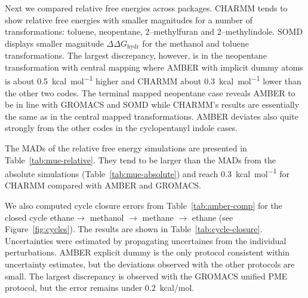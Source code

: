 \documentclass[journal=jctcce,manuscript=article]{achemso}
\begin{document}
Next we compared relative free energies across packages. 
CHARMM tends to show relative free energies with smaller magnitudes for a number of transformations: toluene, neopentane, 2--methylfuran and 2--methylindole. SOMD displays smaller magnitude $\Delta\Delta G_{\mathrm{hydr}}$ for the methanol and toluene transformations.  The largest discrepancy, however, is in the neopentane transformation with central mapping where AMBER with implicit dummy atoms is about \SI{0.5}{kcal.mol^{-1}} higher and CHARMM about \SI{0.3}{kcal.mol^{-1}} lower than the other two codes.  The 
terminal mapped neopentane case reveals AMBER to be in line with GROMACS and SOMD while CHARMM's results are essentially the same as in the central mapped transformations.  AMBER deviates also quite strongly from the other codes in the cyclopentanyl indole cases.

The MADs of the relative free energy simulations are presented in 
Table~\ref{tab:mue-relative}.  They tend to be larger than the MADs from 
the absolute simulations (Table~\ref{tab:mue-absolute}) and reach 
\SI{0.3}{kcal.mol^{-1}} for CHARMM compared with AMBER and GROMACS.

\begin{table}[]
  \begin{minipage}{\linewidth}
    \caption{MAD (in \si{kcal.mol^{-1}}) comparing relative free energies from 
      relative simulations between SOMD, GROMACS, AMBER and 
      CHARMM.}\label{tab:mue-relative}
  \end{minipage}
\end{table}
We also computed cycle closure errors from Table~\ref{tab:amber-comp} for 
the closed cycle ethane$ \rightarrow$ methanol $\rightarrow$ methane $\rightarrow$ ethane (see Figure~\ref{fig:cycles}). The results are shown in Table~\ref{tab:cycle-closure}. Uncertainties were estimated by propagating uncertaines from the individual perturbations. AMBER explicit dummy is the only protocol consistent within uncertainty estimates, but the deviations observed with the other protocols are small. The largest discrepancy is observed with the GROMACS unified PME protocol, but the error remains under \SI{0.2}{kcal/mol}. 
\end{document}
